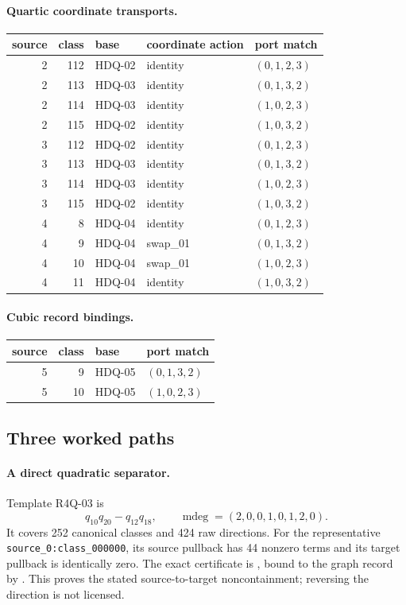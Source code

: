 \paragraph{Quartic coordinate transports.}
\begin{longtable}{r r l l l}
\toprule source & class & base & coordinate action & port match\\\midrule\endhead
2 & 112 & HDQ-02 & identity & $(0,1,2,3)$\\
2 & 113 & HDQ-03 & identity & $(0,1,3,2)$\\
2 & 114 & HDQ-03 & identity & $(1,0,2,3)$\\
2 & 115 & HDQ-02 & identity & $(1,0,3,2)$\\
3 & 112 & HDQ-02 & identity & $(0,1,2,3)$\\
3 & 113 & HDQ-03 & identity & $(0,1,3,2)$\\
3 & 114 & HDQ-03 & identity & $(1,0,2,3)$\\
3 & 115 & HDQ-02 & identity & $(1,0,3,2)$\\
4 & 8 & HDQ-04 & identity & $(0,1,2,3)$\\
4 & 9 & HDQ-04 & swap\_01 & $(0,1,3,2)$\\
4 & 10 & HDQ-04 & swap\_01 & $(1,0,2,3)$\\
4 & 11 & HDQ-04 & identity & $(1,0,3,2)$\\
\bottomrule
\end{longtable}
\paragraph{Cubic record bindings.}
\begin{center}\begin{tabular}{r r l l}
\toprule source & class & base & port match\\\midrule
5 & 9 & HDQ-05 & $(0,1,3,2)$\\
5 & 10 & HDQ-05 & $(1,0,2,3)$\\
\bottomrule
\end{tabular}\end{center}

\subsection{Three worked paths}

\paragraph{A direct quadratic separator.}
Template R4Q-03 is
$$
 q_{10}q_{20}-q_{12}q_{18},\qquad
 \operatorname{mdeg}=(2,0,0,1,0,1,2,0).
$$
It covers 252 canonical classes and
424 raw directions.  For the representative
\texttt{source\_0:class\_000000}, its source pullback has
44 nonzero terms and its target pullback is
identically zero.  The exact certificate is
, bound to the graph record by
.  This proves the stated
source-to-target noncontainment; reversing the direction is not licensed.

